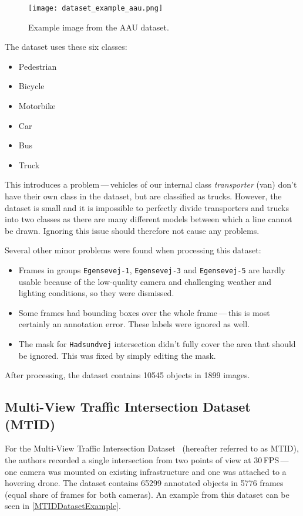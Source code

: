 \begin{figure}[t]
    \centering
    \texttt{[image: dataset\_example\_aau.png]}
    \caption{Example image from the AAU dataset.}
    \label{AAUDatasetExample}
\end{figure}

The dataset uses these six classes:
\begin{itemize}
    \item Pedestrian
    \item Bicycle
    \item Motorbike
    \item Car
    \item Bus
    \item Truck
\end{itemize}
This introduces a problem\,---\,vehicles of our internal class \textit{transporter}
(van) don't have their own class in the dataset, but are classified as trucks.
However, the dataset is small and it is impossible to perfectly divide
transporters and trucks into two classes as there are many different models
between which a line cannot be drawn.  Ignoring this issue should therefore not
cause any problems.

Several other minor problems were found when processing this dataset:
\begin{itemize}
    \item Frames in groups \verb|Egensevej-1|, \verb|Egensevej-3| and
    \verb|Egensevej-5| are hardly usable because of the low-quality camera and
    challenging weather and lighting conditions, so they were dismissed.
    \item Some frames had bounding boxes over the whole frame\,---\,this is most
    certainly an annotation error. These labels were ignored as well.
    \item The mask for \verb|Hadsundvej| intersection didn't fully cover the
    area that should be ignored. This was fixed by simply editing the mask.
\end{itemize}

After processing, the dataset contains \num{10545} objects in \num{1899} images.


\subsection{Multi-View Traffic Intersection Dataset (MTID)}

For the Multi-View Traffic Intersection Dataset~\cite{Jensen2020} (hereafter referred to as MTID), the
authors recorded a single intersection from two points of view at 30\,FPS\,---\,one
camera was mounted on existing infrastructure and one was attached to a hovering
drone. The dataset contains \num{65299} annotated objects in \num{5776} frames
(equal share of frames for both cameras). An example from this dataset can be
seen in \autoref{MTIDDatasetExample}.

